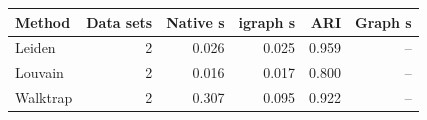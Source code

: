 \begin{tabular}{lrrrrr}
\toprule
Method & Data sets & Native s & igraph s & ARI & Graph s \\
\midrule
Leiden & 2 & 0.026 & 0.025 & 0.959 & -- \\
Louvain & 2 & 0.016 & 0.017 & 0.800 & -- \\
Walktrap & 2 & 0.307 & 0.095 & 0.922 & -- \\
\bottomrule
\end{tabular}
